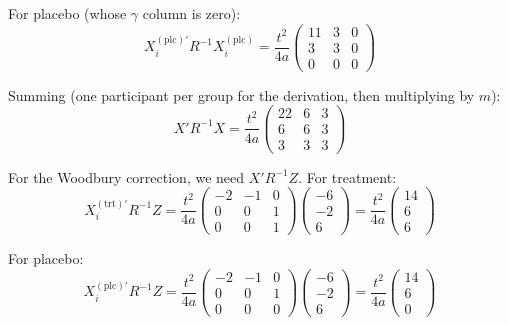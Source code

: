 \documentclass[
]{article}
\begin{document}
For placebo (whose \(\gamma\) column is zero): \begin{equation}
  X_i^{(\text{plc})\prime} R^{-1} X_i^{(\text{plc})}
  = \frac{t^2}{4a}\begin{pmatrix}
    11 & 3 & 0 \\ 3 & 3 & 0 \\ 0 & 0 & 0
  \end{pmatrix}
\end{equation}

Summing (one participant per group for the derivation, then multiplying
by \(m\)): \begin{equation}
  X'R^{-1}X = \frac{t^2}{4a}\begin{pmatrix}
    22 & 6 & 3 \\ 6 & 6 & 3 \\ 3 & 3 & 3
  \end{pmatrix}
\end{equation}

For the Woodbury correction, we need \(X'R^{-1}Z\). For treatment: \[
  X_i^{(\text{trt})\prime}R^{-1}Z
  = \frac{t^2}{4a}\begin{pmatrix}-2&-1&0\\0&0&1\\0&0&1
  \end{pmatrix}
  \begin{pmatrix}-6\\-2\\6\end{pmatrix}
  = \frac{t^2}{4a}\begin{pmatrix}14\\6\\6\end{pmatrix}
\]

For placebo: \[
  X_i^{(\text{plc})\prime}R^{-1}Z
  = \frac{t^2}{4a}\begin{pmatrix}-2&-1&0\\0&0&1\\0&0&0
  \end{pmatrix}
  \begin{pmatrix}-6\\-2\\6\end{pmatrix}
  = \frac{t^2}{4a}\begin{pmatrix}14\\6\\0\end{pmatrix}
\]
\end{document}
